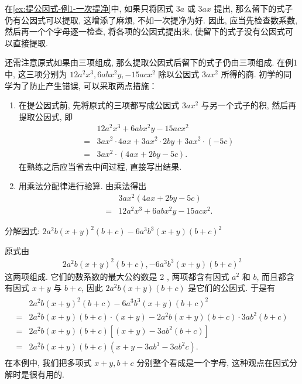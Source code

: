 \begin{note}
	在\autoref{ex:提公因式-例1-一次提净}中, 如果只将因式 $3 a$ 或 $3 a x$ 提出, 那么留下的式子仍有公因式可以提取, 这增添了麻烦, 不如一次提净为好. 因此, 应当先检查数系数, 然后再一个个字母逐一检查, 将各项的公因式提出来, 使留下的式子没有公因式可以直接提取.

	还需注意原式如果由三项组成, 那么提取公因式后留下的式子仍由三项组成. 在例1 中, 这三项分别为 $12 a^{2} x^{3} ,  6 a b x^{2} y , -15 a c x^{2}$ 除以公因式 $3 a x^{2}$ 所得的商. 初学的同学为了防止产生错误, 可以采取两点措施：

	\begin{enumerate}
		\item 在提公因式前, 先将原式的三项都写成公因式 $3 a x^{2}$ 与另一个式子的积, 然后再提取公因式, 即
		      \begin{align*}
			        & 12 a^{2} x^{3}+6 a b x^{2} y-15 a c x^{2}                         \\
			      = & 3 a x^{2} \cdot 4 a x+3 a x^{2} \cdot 2 b y+3 a x^{2} \cdot(-5 c) \\
			      = & 3 a x^{2} \cdot(4 a x+2 b y-5 c) .
		      \end{align*}
		      在熟练之后应当省去中间过程, 直接写出结果.
		\item 用乘法分配律进行验算. 由乘法得出
		      \begin{align*}
			        & 3 a x^{2}(4 a x+2 b y-5 c)                  \\
			      = & 12 a^{2} x^{3}+6 a b x^{2} y-15 a c x^{2} .
		      \end{align*}
	\end{enumerate}
\end{note}

\begin{example}[视“多”为一]\label{ex:提公因式-例2-一次提净}
	分解因式: $2 a^{2} b(x+y)^{2}(b+c)-6 a^{3} b^{3}(x+y)(b+c)^{2}$
\end{example}
\begin{solution}
	原式由
	\begin{align*}
		2 a^{2} b(x+y)^{2}(b+c) , -6 a^{3} b^{3}(x+y)(b+c)^{2}
	\end{align*}
	这两项组成. 它们的数系数的最大公约数是 2 , 两项都含有因式 $a^{2}$ 和 $b$, 而且都含有因式 $x+y$ 与 $b+c$, 因此 $2 a^{2} b(x+y)(b+c)$ 是它们的公因式. 于是有
	\begin{align*}
		\begin{aligned}
			  & 2 a^{2} b(x+y)^{2}(b+c)-6 a^{3} b^{3}(x+y)(b+c)^{2}                     \\
			= & 2 a^{2} b(x+y)(b+c) \cdot(x+y)-2 a^{2} b(x+y)(b+c) \cdot 3 a b^{2}(b+c) \\
			= & 2 a^{2} b(x+y)(b+c)\left[(x+y)-3 a b^{2}(b+c)\right]                    \\
			= & 2 a^{2} b(x+y)(b+c)\left(x+y-3 a b^{3}-3 a b^{2} c\right) .
		\end{aligned}
	\end{align*}
	在本例中, 我们把多项式 $x+y ,  b+c$ 分别整个看成是一个字母, 这种观点在因式分解时是很有用的.
\end{solution}

